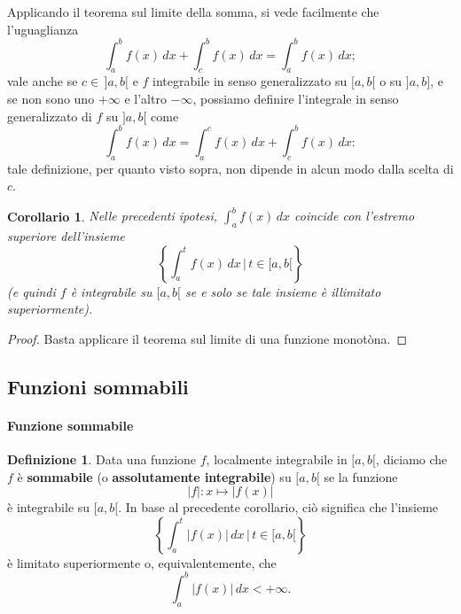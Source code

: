 \documentclass{article}
\theoremstyle{plain}
\newtheorem{cor}{Corollario}
\theoremstyle{definition}
\newtheorem{defn}{Definizione}[section]
\theoremstyle{remark}
\begin{document}
\vspace{10pt}

Applicando il teorema sul limite della somma, si vede facilmente che l'uguaglianza 
\[\int_{a}^{b}f(x)\,dx+\int_{c}^{b}f(x)\,dx=\int_{a}^{b}f(x)\,dx;\]
vale anche se $c\in\, ]a,b[$ e $f$ integrabile in senso generalizzato su $[a,b[$ o su $]a,b]$, e se non sono uno $+\infty$ e l'altro $-\infty$, possiamo definire l'integrale in senso generalizzato di $f$ su $]a,b[$ come 
\[\int_{a}^{b}f(x)\,dx=\int_{a}^{c}f(x)\,dx+\int_{c}^{b}f(x)\,dx:\]
tale definizione, per quanto visto sopra, non dipende in alcun modo dalla scelta di $c$.


\vspace{10pt}

\begin{bxthm}
\begin{cor}\label{corrr}
    Nelle precedenti ipotesi, $\int_{a}^{b}f(x)\,dx$ coincide con l'estremo superiore dell'insieme \[\left\{\int_{a}^{t}f(x)\,dx\,|\,t\in[a,b[\right\}\] (e quindi $f$ è integrabile su $[a,b[$ se e solo se tale insieme è illimitato superiormente).
\end{cor}
\end{bxthm}
\begin{proof}
    Basta applicare il teorema sul limite di una funzione monotòna.
\end{proof}

\vspace{10pt}

\subsection{Funzioni sommabili}

\vspace{10pt}

\paragraph{Funzione sommabile}
\begin{bxthm}
\begin{defn}
    Data una funzione $f$, localmente integrabile in $[a,b[$, diciamo che $f$ è \textbf{sommabile} (o \textbf{assolutamente integrabile}) su $[a,b[$ se la funzione \[|f|:x\mapsto |f(x)|\] è integrabile su $[a,b[$.
    In base al precedente corollario, ciò significa che l'insieme \[\left\{\int_{a}^{t}|f(x)|\,dx\,|\,t\in[a,b[\right\}\] è limitato superiormente o, equivalentemente, che 
    \[\int_{a}^{b}|f(x)|\,dx<+\infty.\]
\end{defn}
\end{bxthm}
\end{document}
